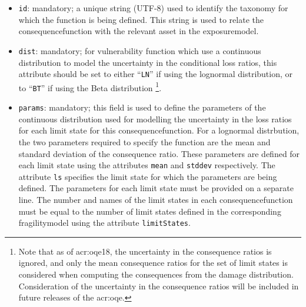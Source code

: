 \begin{itemize}

    \item \Verb+id+: mandatory; a unique string (UTF-8) used to identify the \gls{taxonomy} for 
    which the function is being defined. This string is used to relate the 
    \gls{consequencefunction} with the relevant \gls{asset} in the 
    \gls{exposuremodel}.

    \item \Verb+dist+: mandatory; for vulnerability function which use a continuous 
    distribution to model the uncertainty in the conditional loss ratios, 
    this attribute should be set to either ``\Verb+LN+'' if using the lognormal
    distribution, or to ``\Verb+BT+'' if using the Beta distribution
    \footnote{Note that as of \glsdesc{acr:oqe18}, the uncertainty in the 
    consequence ratios is ignored, and only the mean consequence ratios for the
    set of limit states is considered when computing the consequences from the
    damage distribution. Consideration of the uncertainty in the consequence
    ratios will be included in future releases of the \glsdesc{acr:oqe}.}.

    \item \Verb+params+: mandatory; this field is used to define the parameters of 
    the continuous distribution used for modelling the uncertainty in the
    loss ratios for each limit state for this 
    \gls{consequencefunction}. For a lognormal distrbution, 
    the two parameters required to specify the function are the mean and 
    standard deviation of the consequence ratio. These parameters are defined for 
    each limit state using the attributes \Verb+mean+ and \Verb+stddev+ 
    respectively. The attribute \Verb+ls+ specifies the limit state for which 
    the parameters are being defined. The parameters for each limit state
    must be provided on a separate line. The number and names of the limit 
    states in each \gls{consequencefunction} must be equal to the number of limit 
    states defined in the corresponding \gls{fragilitymodel}
    using the attribute \Verb+limitStates+.

\end{itemize}